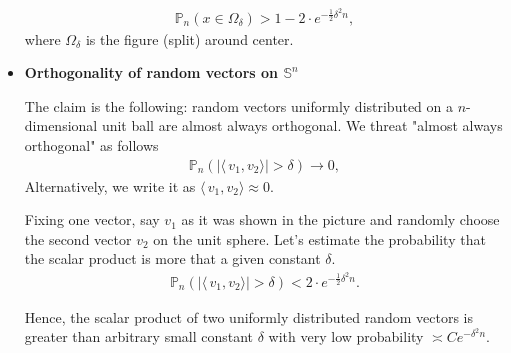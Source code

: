 \begin{itemize}
\begin{eqnarray}
\mathbb{P}_n( x \in \Omega_{\delta}) > 1 - 2 \cdot e^{-\frac 1 2 \delta^2 n }, 
\end{eqnarray}
where $\Omega_{\delta}$ is the figure (split) around center. 
\item {\bf Orthogonality of random vectors on $\mathbb{S}^n$}
\par The claim is the following: random vectors uniformly distributed on a $n$-dimensional unit ball are almost always orthogonal. We threat "almost always orthogonal" as follows 
\begin{eqnarray}
\mathbb{P}_n(|\langle\, v_1, v_2 \rangle| > \delta) \to 0,
\end{eqnarray}
Alternatively, we write it as $\langle\,v_1, v_2 \rangle \approx 0$. \par
\par Fixing one vector, say $v_1$ as it was shown in the picture and randomly choose the second vector $v_2$ on the unit sphere. Let's estimate the probability that the scalar product is more that a given constant $\delta$. 
\begin{eqnarray}
\mathbb{P}_n(|\langle\, v_1, v_2 \rangle| > \delta) < 2 \cdot e^{-\frac 1 2 \delta^2 n}.
\end{eqnarray}
\begin{center}
\end{center}
Hence, the scalar product of two uniformly distributed random vectors is greater than arbitrary small constant $\delta$ with very low probability $\asymp Ce^{-\delta^2 n}$. 
\begin{re}

\end{re}
\end{itemize}
